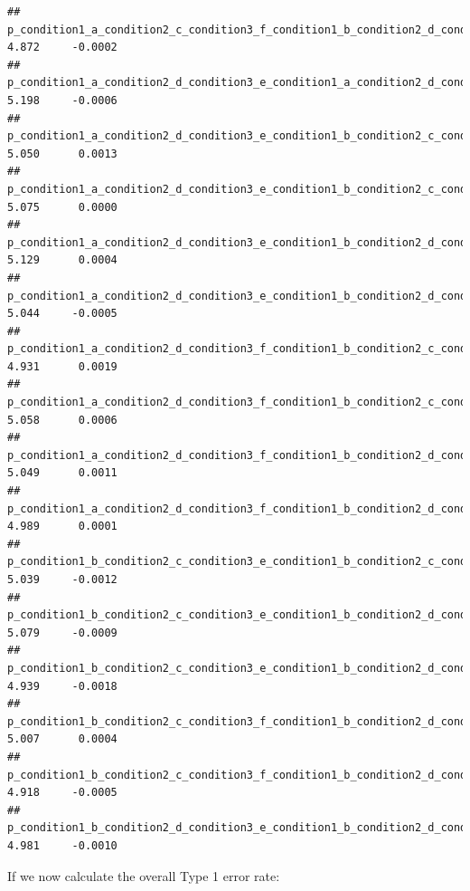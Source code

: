 \documentclass[]{article}
\newenvironment{Shaded}{\begin{snugshade}}{\end{snugshade}}
\newcommand{\KeywordTok}[1]{\textcolor[rgb]{0.13,0.29,0.53}{\textbf{#1}}}
\newcommand{\DecValTok}[1]{\textcolor[rgb]{0.00,0.00,0.81}{#1}}
\newcommand{\StringTok}[1]{\textcolor[rgb]{0.31,0.60,0.02}{#1}}
\newcommand{\ControlFlowTok}[1]{\textcolor[rgb]{0.13,0.29,0.53}{\textbf{#1}}}
\newcommand{\OperatorTok}[1]{\textcolor[rgb]{0.81,0.36,0.00}{\textbf{#1}}}
\newcommand{\NormalTok}[1]{#1}
\begin{document}
\begin{verbatim}
## p_condition1_a_condition2_c_condition3_f_condition1_b_condition2_d_condition3_f 4.872     -0.0002
## p_condition1_a_condition2_d_condition3_e_condition1_a_condition2_d_condition3_f 5.198     -0.0006
## p_condition1_a_condition2_d_condition3_e_condition1_b_condition2_c_condition3_e 5.050      0.0013
## p_condition1_a_condition2_d_condition3_e_condition1_b_condition2_c_condition3_f 5.075      0.0000
## p_condition1_a_condition2_d_condition3_e_condition1_b_condition2_d_condition3_e 5.129      0.0004
## p_condition1_a_condition2_d_condition3_e_condition1_b_condition2_d_condition3_f 5.044     -0.0005
## p_condition1_a_condition2_d_condition3_f_condition1_b_condition2_c_condition3_e 4.931      0.0019
## p_condition1_a_condition2_d_condition3_f_condition1_b_condition2_c_condition3_f 5.058      0.0006
## p_condition1_a_condition2_d_condition3_f_condition1_b_condition2_d_condition3_e 5.049      0.0011
## p_condition1_a_condition2_d_condition3_f_condition1_b_condition2_d_condition3_f 4.989      0.0001
## p_condition1_b_condition2_c_condition3_e_condition1_b_condition2_c_condition3_f 5.039     -0.0012
## p_condition1_b_condition2_c_condition3_e_condition1_b_condition2_d_condition3_e 5.079     -0.0009
## p_condition1_b_condition2_c_condition3_e_condition1_b_condition2_d_condition3_f 4.939     -0.0018
## p_condition1_b_condition2_c_condition3_f_condition1_b_condition2_d_condition3_e 5.007      0.0004
## p_condition1_b_condition2_c_condition3_f_condition1_b_condition2_d_condition3_f 4.918     -0.0005
## p_condition1_b_condition2_d_condition3_e_condition1_b_condition2_d_condition3_f 4.981     -0.0010
\end{verbatim}

If we now calculate the overall Type 1 error rate:

\begin{Shaded}
\end{Shaded}
\end{document}
